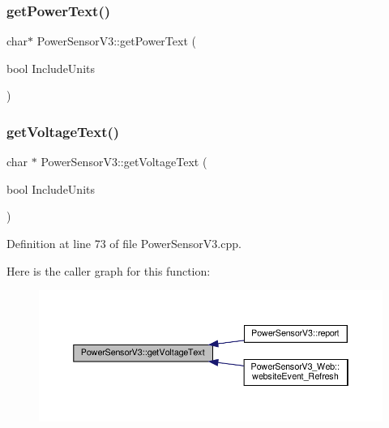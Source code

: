\subsubsection{\texorpdfstring{get\+Power\+Text()}{getPowerText()}\hspace{0.1cm}{\footnotesize\ttfamily [2/2]}}
{\footnotesize\ttfamily char$\ast$ Power\+Sensor\+V3\+::get\+Power\+Text (\begin{DoxyParamCaption}\item[{bool}]{Include\+Units }\end{DoxyParamCaption})}

\mbox{\label{class_power_sensor_v3_a506c7292897607d7dd31d3ff3696806a}} 
\subsubsection{\texorpdfstring{get\+Voltage\+Text()}{getVoltageText()}\hspace{0.1cm}{\footnotesize\ttfamily [1/2]}}
{\footnotesize\ttfamily char $\ast$ Power\+Sensor\+V3\+::get\+Voltage\+Text (\begin{DoxyParamCaption}\item[{bool}]{Include\+Units }\end{DoxyParamCaption})}



Definition at line 73 of file Power\+Sensor\+V3.\+cpp.

Here is the caller graph for this function\+:
\nopagebreak
\begin{figure}[H]
\begin{center}
\leavevmode
\includegraphics[width=350pt]{class_power_sensor_v3_a506c7292897607d7dd31d3ff3696806a_icgraph}
\end{center}
\end{figure}
\mbox{\label{class_power_sensor_v3_acd023ce18fb9a3f1530c722eb0f34eb1}} 
